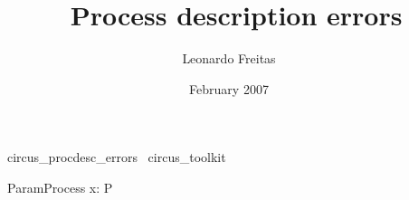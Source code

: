 \documentclass{article}
\begin{document}
\title{\Circus\ Process description errors}
\author{Leonardo Freitas}
\date{February 2007}

\maketitle

\begin{zsection}
  \SECTION\ circus\_procdesc\_errors \parents\ circus\_toolkit
\end{zsection}

\begin{circus}
    \circprocess\ ParamProcess \circdef x: \nat \circspot P
\end{circus}
\end{document}
